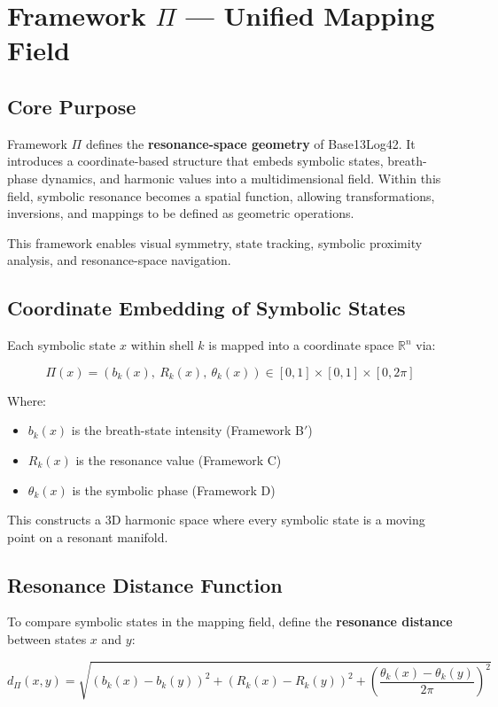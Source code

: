 \section*{Framework $\Pi$ — Unified Mapping Field}

\subsection*{Core Purpose}

Framework $\Pi$ defines the \textbf{resonance-space geometry} of Base13Log42. It introduces a coordinate-based structure that embeds symbolic states, breath-phase dynamics, and harmonic values into a multidimensional field. Within this field, symbolic resonance becomes a spatial function, allowing transformations, inversions, and mappings to be defined as geometric operations.

This framework enables visual symmetry, state tracking, symbolic proximity analysis, and resonance-space navigation.

\subsection*{Coordinate Embedding of Symbolic States}

Each symbolic state $x$ within shell $k$ is mapped into a coordinate space $\mathbb{R}^n$ via:

\[
\Pi(x) = \left( b_k(x),\ R_k(x),\ \theta_k(x) \right)
\in [0,1] \times [0,1] \times [0,2\pi]
\]

Where:
\begin{itemize}
  \item $b_k(x)$ is the breath-state intensity (Framework B$'$)
  \item $R_k(x)$ is the resonance value (Framework C)
  \item $\theta_k(x)$ is the symbolic phase (Framework D)
\end{itemize}

This constructs a 3D harmonic space where every symbolic state is a moving point on a resonant manifold.

\subsection*{Resonance Distance Function}

To compare symbolic states in the mapping field, define the \textbf{resonance distance} between states $x$ and $y$:

\[
d_\Pi(x, y) = \sqrt{
(b_k(x) - b_k(y))^2 +
(R_k(x) - R_k(y))^2 +
\left( \frac{\theta_k(x) - \theta_k(y)}{2\pi} \right)^2
}
\]

